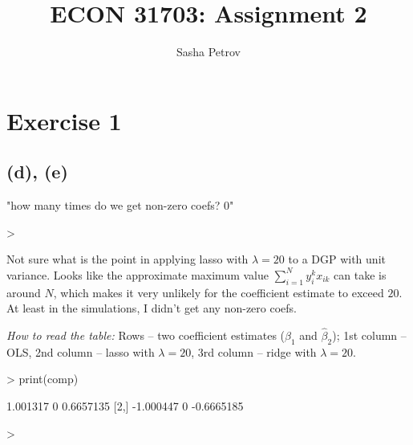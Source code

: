 \documentclass[a4paper,12pt,twoside]{article}
\title{ECON 31703: Assignment 2}
\author{Sasha Petrov}
\begin{document}


\maketitle

\section*{Exercise 1}



\subsection*{(d), (e)}

\begin{Schunk}
\begin{Soutput}
[1] "how many times do we get non-zero coefs? 0"
\end{Soutput}
\begin{Sinput}
> 
\end{Sinput}
\end{Schunk}


Not sure what is the point in applying lasso with $\lambda = 20$ to a DGP with unit variance. Looks like the approximate maximum value $\sum_{i = 1}^N y_i^k x_{ik}$ can take is around $N$, which makes it very unlikely for the coefficient estimate to exceed $20$. At least in the simulations, I didn't get any non-zero coefs.

\textit{How to read the table:} Rows -- two coefficient estimates ($\hat \beta_1$ and $\hat \beta_2$); 1st column -- OLS, 2nd column -- lasso with $\lambda = 20$,
3rd column -- ridge with $\lambda = 20$.

\begin{Schunk}
\begin{Sinput}
> print(comp)
\end{Sinput}
\begin{Soutput}
          [,1] [,2]       [,3]
[1,]  1.001317    0  0.6657135
[2,] -1.000447    0 -0.6665185
\end{Soutput}
\begin{Sinput}
> 
\end{Sinput}
\end{Schunk}
\end{document}
